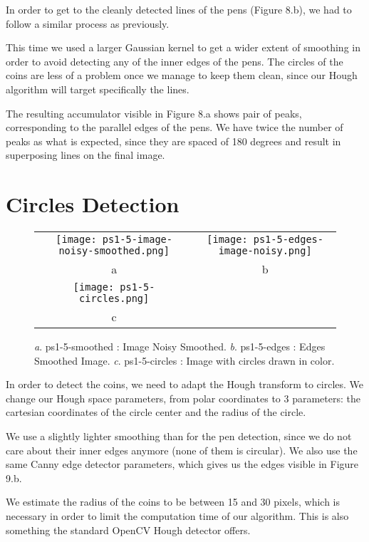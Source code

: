 \documentclass[a4paper,11pt]{article}
\begin{document}
In order to get to the cleanly detected lines of the pens (Figure 8.b), we had to follow a similar process as previously.

This time we used a larger Gaussian kernel to get a wider extent of smoothing in order to avoid detecting any of the inner edges of the pens. The circles of the coins are less of a problem once we manage to keep them clean, since our Hough algorithm will target specifically the lines.

The resulting accumulator visible in Figure 8.a shows pair of peaks, corresponding to the parallel edges of the pens. We have twice the number of peaks as what is expected, since they are spaced of 180 degrees and result in superposing lines on the final image.

\section{Circles Detection}

 \begin{figure}[H]
\begin{center}
\begin{tabular}{cc}
\texttt{[image: ps1-5-image-noisy-smoothed.png]}&
\texttt{[image: ps1-5-edges-image-noisy.png]}\\
	a&b\\
\texttt{[image: ps1-5-circles.png]}\\
c
\end{tabular}
\end{center}
 \caption{
\textit{a}. ps1-5-smoothed : Image Noisy Smoothed.  \textit{b}. ps1-5-edges : Edges Smoothed Image.
\textit{c}. ps1-5-circles : Image with circles drawn in color. }
\label{ps1-5}
\end{figure}

In order to detect the coins, we need to adapt the Hough transform to circles. We change our Hough space parameters, from polar coordinates to 3 parameters: the cartesian coordinates of the circle center and the radius of the circle.

We use a slightly lighter smoothing than for the pen detection, since we do not care about their inner edges anymore (none of them is circular). We also use the same Canny edge detector parameters, which gives us the edges visible in Figure 9.b.

We estimate the radius of the coins to be between 15 and 30 pixels, which is necessary in order to limit the computation time of our algorithm. This is also something the standard OpenCV Hough detector offers.
\end{document}
